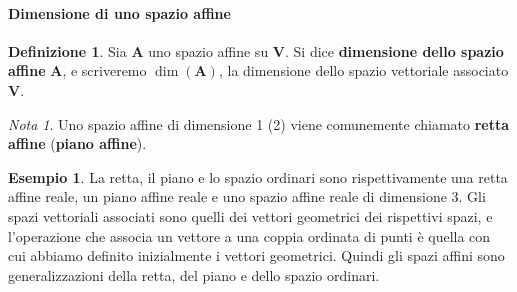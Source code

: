 \documentclass{article}
\theoremstyle{plain}
\theoremstyle{definition}
\newtheorem{defn}{Definizione}[section]
\newtheorem{exmp}{Esempio}[section]
\theoremstyle{remark}
\newtheorem{note}{Nota}
\begin{document}
\vspace{10pt}

\paragraph{Dimensione di uno spazio affine}
\begin{bxthm}
\begin{defn}
    Sia $\mathbf{A}$ uno spazio affine su $\mathbf{V}$. 
    Si dice \textbf{dimensione dello spazio affine} $\mathbf{A}$, e scriveremo $\dim(\mathbf{A})$, la dimensione dello spazio vettoriale associato $\mathbf{V}$.
\end{defn}
\end{bxthm}

\vspace{10pt}

\begin{note}
    Uno spazio affine di dimensione 1 (2) viene comunemente chiamato \textbf{retta affine} (\textbf{piano affine}).    
\end{note}

\vspace{10pt}

\begin{exmp}
    La retta, il piano e lo spazio ordinari sono rispettivamente una retta affine reale, un piano affine reale e uno spazio affine reale di dimensione 3. 
    Gli spazi vettoriali associati sono quelli dei vettori geometrici dei rispettivi spazi, e l'operazione che associa un vettore a una coppia ordinata di punti 
    è quella con cui abbiamo definito inizialmente i vettori geometrici. Quindi gli spazi affini sono generalizzazioni della retta, del piano e dello spazio ordinari.
\end{exmp}

\vspace{10pt}
\end{document}
